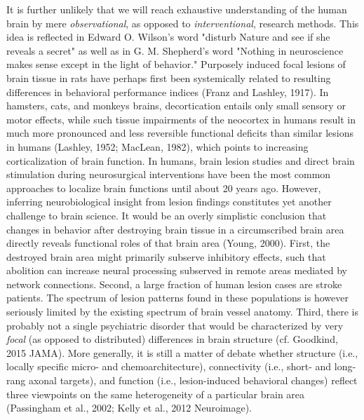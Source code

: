 \documentclass[authoryear,review,3p]{elsarticle}
\begin{document}
It is further unlikely that we
will reach exhaustive understanding of
the human brain by mere
\textit{observational}, as opposed to \textit{interventional},
research methods.
This idea is reflected in
Edward O. Wilson's word 
"disturb Nature and see if she reveals a secret"
as well as in
G. M. Shepherd's word
"Nothing in neuroscience makes sense except in the light of behavior."
%
Purposely induced focal lesions of brain tissue in rats have perhaps
first been systemically related to resulting differences in
behavioral performance indices
(Franz and Lashley, 1917).
In hamsters, cats, and monkeys brains,
decortication entails only small sensory or motor effects,
while such tissue impairments of the neocortex in humans
result in much more pronounced and less reversible 
functional deficits than similar lesions in humans
(Lashley, 1952; MacLean, 1982),
which points to increasing corticalization of brain function.
In humans, brain lesion studies and direct brain stimulation during
neurosurgical interventions have been
the most common approaches
to localize brain functions
until about 20 years ago.
%
However, inferring neurobiological insight from lesion findings constitutes
yet another challenge to brain science.
It would be an overly simplistic conclusion that
changes in behavior after destroying brain tissue in a
circumscribed brain area directly reveals functional roles
of that brain area (Young, 2000).
%
First,
the destroyed brain area might  primarily subserve inhibitory effects,
such that abolition can increase neural processing subserved in remote areas
mediated by network connections.
Second,
a large fraction of human lesion cases are stroke patients.
The spectrum of lesion patterns found in these populations
is however seriously limited by the existing spectrum of
brain vessel anatomy.
Third,
there is probably not a single psychiatric disorder that would be
characterized by very \textit{focal} (as opposed to distributed)
differences in brain structure
(cf. Goodkind, 2015 JAMA).
%
More generally, it is still a matter of debate whether
structure (i.e., locally specific micro- and chemoarchitecture),
connectivity (i.e., short- and long-rang axonal targets),
and function (i.e., lesion-induced behavioral changes)
reflect three  viewpoints on the same heterogeneity of
a particular brain area
(Passingham et al., 2002; Kelly et al., 2012 Neuroimage).
\end{document}
